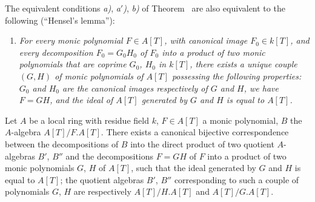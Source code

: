 \begin{remark}[18.5.13]
\label{IV.18.5.13}
The equivalent conditions \emph{a)}, \emph{a$'$)}, \emph{b)} of Theorem~ are also equivalent to the following (``Hensel's lemma''):
\begin{enumerate}
  \item[\textup{a$''$)}] \itshape For every monic polynomial $F\in A[T]$, with canonical image $F_0\in k[T]$, and every decomposition $F_0=G_0 H_0$ of $F_0$ into a product of two monic polynomials that are \textup{coprime} $G_0$, $H_0$ in $k[T]$, there exists a unique couple $(G,H)$ of monic polynomials of $A[T]$ possessing the following properties:
$G_0$ and $H_0$ are the canonical images respectively of $G$ and $H$, we have $F=GH$, and the ideal of $A[T]$ generated by $G$ and $H$ is equal to $A[T]$.
\end{enumerate}
\end{remark}

\begin{lemma}[18.5.13.1]
\label{IV.18.5.13.1}
Let $A$ be a local ring with residue field $k$, $F\in A[T]$ a monic polynomial, $B$ the $A$-algebra $A[T]/F.A[T]$.
There exists a canonical bijective correspondence between the decompositions of $B$ into the direct product of two quotient $A$-algebras $B'$, $B''$ and the decompositions $F=GH$ of $F$ into a product of two monic polynomials $G$, $H$ of $A[T]$, such that the ideal generated by $G$ and $H$ is equal to $A[T]$;
the quotient algebras $B'$, $B''$ corresponding to such a couple of polynomials $G$, $H$ are respectively $A[T]/H.A[T]$ and $A[T]/G.A[T]$.
\end{lemma}

